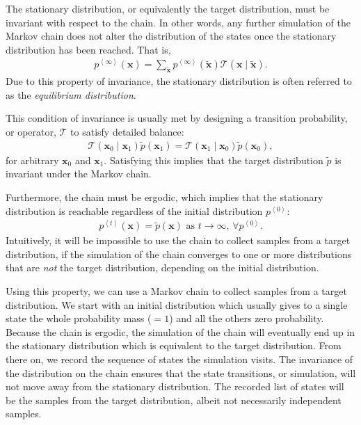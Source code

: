 \documentclass[dissertation,nocontribution,draft*]{aaltoseries}
\newcommand{\qt}[1]{\left<#1\right>}
\newcommand{\vect}[1]{\mathbf{#1}}
\newcommand{\vx}[0]{\vect{x}}
\newcommand{\T}[0]{\mathcal{T}}
\begin{document}
The stationary distribution, or equivalently the target
distribution, must be invariant with respect to the chain.
In other words, any further simulation of the Markov chain
does not alter the distribution of the states once the
stationary distribution has been reached. That is,
\begin{align*}
    p^{\qt{\infty}}(\vx) = \sum_{\tilde{\vx}}
    p^{\qt{\infty}}(\tilde{\vx}) \T(\vx \mid \tilde{\vx}).
\end{align*}
Due to this property of invariance, the stationary
distribution is often referred to as the \textit{equilibrium
distribution}.

This condition of invariance is usually met by designing a
transition probability, or operator, $\T$ to satisfy 
detailed balance:
\begin{align*}
    \T(\vx_0 \mid \vx_1)\tilde{p}(\vx_1) = \T(\vx_1 \mid
    \vx_0)\tilde{p}(\vx_0),
\end{align*}
for arbitrary $\vx_{0}$ and $\vx_{1}$.  Satisfying this
implies that the target distribution $\tilde{p}$ is
invariant under the Markov chain.

Furthermore, the chain must be ergodic, which implies that
the stationary distribution is reachable
regardless of the initial distribution $p^{\qt{0}}$:
\begin{align}
    \label{eq:mcmc_ergodic}
    p^{\qt{t}}(\vx) = \tilde{p}(\vx)\text{ as }t \to
    \infty\text{, }\forall p^{\qt{0}}.
\end{align}
Intuitively, it will be impossible to use the chain to
collect samples from a target distribution, if the
simulation of the chain converges to one or more
distributions that are \textit{not} the target distribution,
depending on the initial distribution.

Using this property, we can use a Markov chain to collect
samples from a target distribution. We start with an initial
distribution which usually gives to a single state the whole
probability mass ($=1$) and all the others zero probability. Because the
chain is ergodic, the simulation of the chain will
eventually end up in the stationary distribution which is
equivalent to the target distribution. From there on, we
record the sequence of states the simulation visits. The
invariance of the distribution on the chain ensures that the
state transitions, or simulation, will not move away from
the stationary distribution. The recorded list of states
will be the samples from the target distribution, albeit not
necessarily independent samples.
\end{document}
